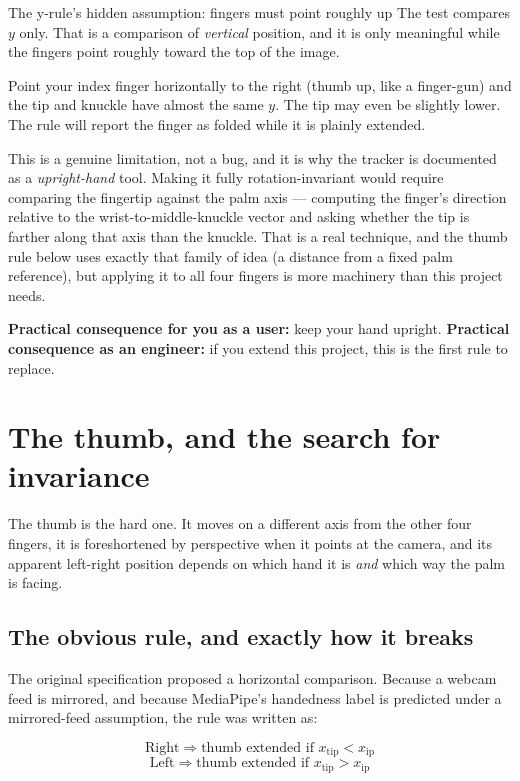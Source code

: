 \begin{edgetrap}{The y-rule's hidden assumption: fingers must point roughly up}
The test compares $y$ only. That is a comparison of \emph{vertical} position, and it is only
meaningful while the fingers point roughly toward the top of the image.

Point your index finger horizontally to the right (thumb up, like a finger-gun) and the tip and
knuckle have almost the same $y$. The tip may even be slightly lower. The rule will report the finger
as folded while it is plainly extended.

This is a genuine limitation, not a bug, and it is why the tracker is documented as a
\emph{upright-hand} tool. Making it fully rotation-invariant would require comparing the fingertip
against the palm axis --- computing the finger's direction relative to the wrist-to-middle-knuckle
vector and asking whether the tip is farther along that axis than the knuckle. That is a real
technique, and the thumb rule below uses exactly that family of idea (a distance from a fixed palm
reference), but applying it to all four fingers is more machinery than this project needs.

\textbf{Practical consequence for you as a user:} keep your hand upright. \textbf{Practical
consequence as an engineer:} if you extend this project, this is the first rule to replace.
\end{edgetrap}

\section{The thumb, and the search for invariance}
\label{sec:thumb}

The thumb is the hard one. It moves on a different axis from the other four fingers, it is
foreshortened by perspective when it points at the camera, and its apparent left-right position
depends on which hand it is \emph{and} which way the palm is facing.

\subsection{The obvious rule, and exactly how it breaks}

The original specification proposed a horizontal comparison. Because a webcam feed is mirrored, and
because MediaPipe's handedness label is predicted under a mirrored-feed assumption, the rule was
written as:

$$\text{Right} \Rightarrow \text{thumb extended if } x_{\text{tip}} < x_{\text{ip}}$$
$$\text{Left} \Rightarrow \text{thumb extended if } x_{\text{tip}} > x_{\text{ip}}$$

